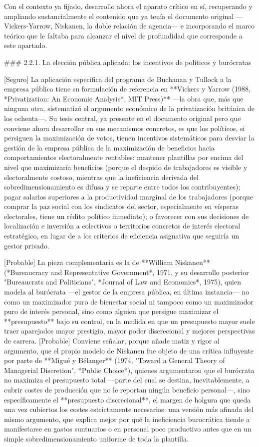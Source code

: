 \documentclass[10pt,a4paper]{article}
\begin{document}
Con el contexto ya fijado, desarrollo ahora el aparato crítico en sí, recuperando y ampliando sustancialmente el contenido que ya tenía el documento original —Vickers-Yarrow, Niskanen, la doble relación de agencia— e incorporando el marco teórico que le faltaba para alcanzar el nivel de profundidad que corresponde a este apartado.

### 2.2.1. La elección pública aplicada: los incentivos de políticos y burócratas

[Seguro] La aplicación específica del programa de Buchanan y Tullock a la empresa pública tiene su formulación de referencia en **Vickers y Yarrow (1988, *Privatization: An Economic Analysis*, MIT Press)** —la obra que, más que ninguna otra, sistematizó el argumento económico de la privatización británica de los ochenta—. Su tesis central, ya presente en el documento original pero que conviene ahora desarrollar en sus mecanismos concretos, es que los políticos, si persiguen la maximización de votos, tienen incentivos sistemáticos para desviar la gestión de la empresa pública de la maximización de beneficios hacia comportamientos electoralmente rentables: mantener plantillas por encima del nivel que maximizaría beneficios (porque el despido de trabajadores es visible y electoralmente costoso, mientras que la ineficiencia derivada del sobredimensionamiento es difusa y se reparte entre todos los contribuyentes); pagar salarios superiores a la productividad marginal de los trabajadores (porque comprar la paz social con los sindicatos del sector, especialmente en vísperas electorales, tiene un rédito político inmediato); o favorecer con sus decisiones de localización e inversión a colectivos o territorios concretos de interés electoral estratégico, en lugar de a los criterios de eficiencia asignativa que seguiría un gestor privado.

[Probable] La pieza complementaria es la de **William Niskanen** (*Bureaucracy and Representative Government*, 1971, y su desarrollo posterior "Bureaucrats and Politicians", *Journal of Law and Economics*, 1975), quien modela al burócrata —el gestor de la empresa pública, en última instancia— no como un maximizador puro de bienestar social ni tampoco como un maximizador puro de interés personal, sino como alguien que persigue maximizar el **presupuesto** bajo su control, en la medida en que un presupuesto mayor suele traer aparejados mayor prestigio, mayor poder discrecional y mejores perspectivas de carrera. [Probable] Conviene señalar, porque añade matiz y rigor al argumento, que el propio modelo de Niskanen fue objeto de una crítica influyente por parte de **Migué y Bélanger** (1974, "Toward a General Theory of Managerial Discretion", *Public Choice*), quienes argumentaron que el burócrata no maximiza el presupuesto total —parte del cual se destina, inevitablemente, a cubrir costes de producción que no le reportan ningún beneficio personal—, sino específicamente el **presupuesto discrecional**, el margen de holgura que queda una vez cubiertos los costes estrictamente necesarios: una versión más afinada del mismo argumento, que explica mejor por qué la ineficiencia burocrática tiende a manifestarse en gastos suntuarios o en personal poco productivo antes que en un simple sobredimensionamiento uniforme de toda la plantilla.
\end{document}
